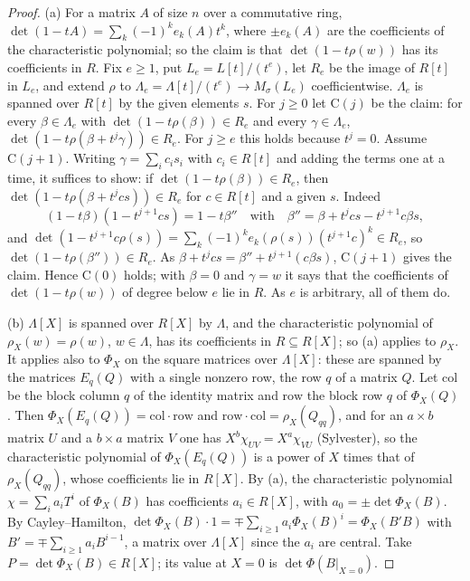 \begin{proof}
(a) For a matrix $A$ of size $n$ over a commutative ring, $\det(1-tA)=\sum_k(-1)^ke_k(A)t^k$, where $\pm e_k(A)$ are the coefficients of the characteristic polynomial; so the claim is that $\det(1-t\rho(w))$ has its coefficients in $R$. Fix
$e\ge1$, put $L_e=L[t]/(t^e)$, let $R_e$ be the image of $R[t]$ in $L_e$, and extend $\rho$ to $\Lambda_e=\Lambda[t]/(t^e)\to M_\sigma(L_e)$ coefficientwise. $\Lambda_e$ is spanned over $R[t]$ by the given elements $s$. For $j\ge0$ let $\mathrm C(j)$
be the claim: for every $\beta\in\Lambda_e$ with $\det(1-t\rho(\beta))\in R_e$ and every $\gamma\in\Lambda_e$, $\det(1-t\rho(\beta+t^j\gamma))\in R_e$. For $j\ge e$ this holds because $t^j=0$. Assume $\mathrm C(j+1)$. Writing $\gamma=\sum_ic_is_i$ with $c_i\in R[t]$ and
adding the terms one at a time, it suffices to show: if $\det(1-t\rho(\beta))\in R_e$, then $\det(1-t\rho(\beta+t^jcs))\in R_e$ for $c\in R[t]$ and a given $s$. Indeed
\[
  (1-t\beta)(1-t^{j+1}cs)=1-t\beta''\quad\text{with}\quad\beta''=\beta+t^jcs-t^{j+1}c\beta s,
\]
and $\det(1-t^{j+1}c\rho(s))=\sum_k(-1)^ke_k(\rho(s))(t^{j+1}c)^k\in R_e$, so $\det(1-t\rho(\beta''))\in R_e$. As $\beta+t^jcs=\beta''+t^{j+1}(c\beta s)$, $\mathrm C(j+1)$ gives the claim. Hence $\mathrm C(0)$ holds; with $\beta=0$ and $\gamma=w$ it says that the
coefficients of $\det(1-t\rho(w))$ of degree below $e$ lie in $R$. As $e$ is arbitrary, all of them do.

(b) $\Lambda[X]$ is spanned over $R[X]$ by $\Lambda$, and the characteristic polynomial of $\rho_X(w)=\rho(w)$, $w\in\Lambda$, has its coefficients in $R\subseteq R[X]$; so (a) applies to $\rho_X$. It applies also to $\Phi_X$ on the square matrices over $\Lambda[X]$:
these are spanned by the matrices $E_q(Q)$ with a single nonzero row, the row $q$ of a matrix $Q$. Let $\mathrm{col}$ be the block column $q$ of the identity matrix and $\mathrm{row}$ the block row $q$ of $\Phi_X(Q)$. Then
$\Phi_X(E_q(Q))=\mathrm{col}\cdot\mathrm{row}$ and $\mathrm{row}\cdot\mathrm{col}=\rho_X(Q_{qq})$, and for an $a\times b$ matrix $U$ and a $b\times a$ matrix $V$ one has $X^b\chi_{UV}=X^a\chi_{VU}$ (Sylvester), so the characteristic polynomial of $\Phi_X(E_q(Q))$ is a power of $X$
times that of $\rho_X(Q_{qq})$, whose coefficients lie in $R[X]$. By (a), the characteristic polynomial $\chi=\sum_ia_iT^i$ of $\Phi_X(B)$ has coefficients $a_i\in R[X]$, with $a_0=\pm\det\Phi_X(B)$. By Cayley--Hamilton,
$\det\Phi_X(B)\cdot1=\mp\sum_{i\ge1}a_i\Phi_X(B)^i=\Phi_X(B'B)$ with $B'=\mp\sum_{i\ge1}a_iB^{i-1}$, a matrix over $\Lambda[X]$ since the $a_i$ are central. Take $P=\det\Phi_X(B)\in R[X]$; its value at $X=0$ is $\det\Phi(B|_{X=0})$.
\end{proof}

